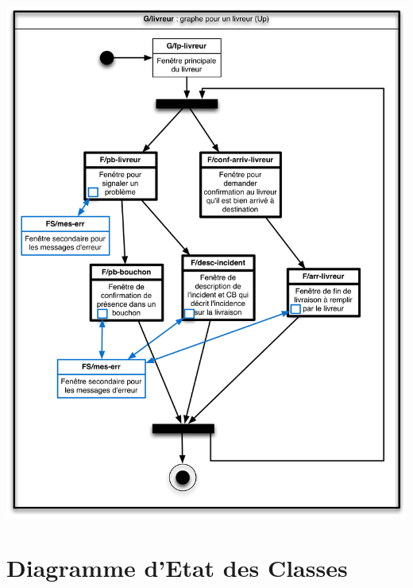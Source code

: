 \documentclass{report}
\begin{document}
\paragraph{}
~~\\
\begin{center}
\includegraphics[scale = 0.2]{images/g-livreur.jpg}
\end{center}

\section{Diagramme d'Etat des Classes}
\end{document}

